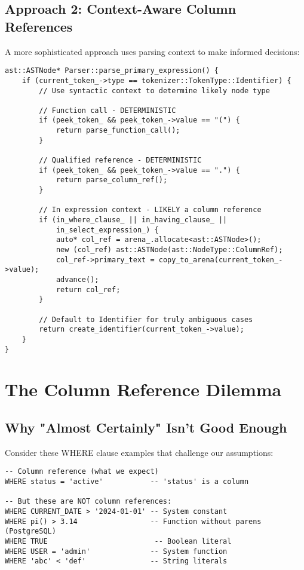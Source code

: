 \documentclass[11pt,a4paper]{article}
\begin{document}
\subsection{Approach 2: Context-Aware Column References}

A more sophisticated approach uses parsing context to make informed decisions:

\begin{lstlisting}[style=cpp]
ast::ASTNode* Parser::parse_primary_expression() {
    if (current_token_->type == tokenizer::TokenType::Identifier) {
        // Use syntactic context to determine likely node type
        
        // Function call - DETERMINISTIC
        if (peek_token_ && peek_token_->value == "(") {
            return parse_function_call();
        }
        
        // Qualified reference - DETERMINISTIC
        if (peek_token_ && peek_token_->value == ".") {
            return parse_column_ref();
        }
        
        // In expression context - LIKELY a column reference
        if (in_where_clause_ || in_having_clause_ || 
            in_select_expression_) {
            auto* col_ref = arena_.allocate<ast::ASTNode>();
            new (col_ref) ast::ASTNode(ast::NodeType::ColumnRef);
            col_ref->primary_text = copy_to_arena(current_token_->value);
            advance();
            return col_ref;
        }
        
        // Default to Identifier for truly ambiguous cases
        return create_identifier(current_token_->value);
    }
}
\end{lstlisting}

\section{The Column Reference Dilemma}

\subsection{Why "Almost Certainly" Isn't Good Enough}

Consider these WHERE clause examples that challenge our assumptions:

\begin{lstlisting}[style=sql]
-- Column reference (what we expect)
WHERE status = 'active'           -- 'status' is a column

-- But these are NOT column references:
WHERE CURRENT_DATE > '2024-01-01' -- System constant
WHERE pi() > 3.14                 -- Function without parens (PostgreSQL)
WHERE TRUE                         -- Boolean literal
WHERE USER = 'admin'              -- System function
WHERE 'abc' < 'def'               -- String literals
\end{lstlisting}
\end{document}
